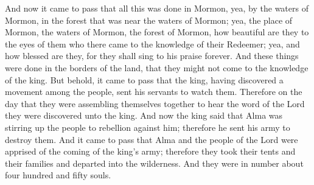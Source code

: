 And now it came to pass that all this was done in Mormon, yea, by the waters of Mormon, in the forest that was near the waters of Mormon; yea, the place of Mormon, the waters of Mormon, the forest of Mormon, how beautiful are they to the eyes of them who there came to the knowledge of their Redeemer; yea, and how blessed are they, for they shall sing to his praise forever.
\bverse \iffalse And these things were done in the borders of the land, that they might not come to the knowledge of the king. \fi
And these things were done in the borders of the land, that they might not come to the knowledge of the king.
\bverse \iffalse But behold, it came to pass that the king, having discovered a movement among the people, sent his servants to watch them.  Therefore on the day that they were assembling themselves together to hear the word of the Lord they were discovered unto the king. \fi
But behold, it came to pass that the king, having discovered a movement among the people, sent his servants to watch them.  Therefore on the day that they were assembling themselves together to hear the word of the Lord they were discovered unto the king.
\bverse \iffalse And now the king said that Alma was stirring up the people to rebellion against him; therefore he sent his army to destroy them. \fi
And now the king said that Alma was stirring up the people to rebellion against him; therefore he sent his army to destroy them.
\bverse \iffalse And it came to pass that Alma and the people of the Lord were apprised of the coming of the king's army; therefore they took their tents and their families and departed into the wilderness. \fi
And it came to pass that Alma and the people of the Lord were apprised of the coming of the king's army; therefore they took their tents and their families and departed into the wilderness.
\bverse \iffalse And they were in number about four hundred and fifty souls. \fi
And they were in number about four hundred and fifty souls.

